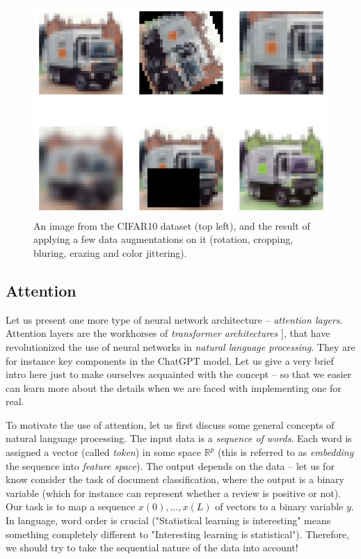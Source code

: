 \documentclass{article}
\newcommand{\R}{\mathbb{R}}
\begin{document}
\begin{figure}
    \centering
    \includegraphics[width=0.65\linewidth]{graphics/augmentation.png}
    \caption{An image from the CIFAR10 dataset (top left), and the result of applying a few data augmentations on it (rotation, cropping, bluring, erazing and color jittering).}
    \label{fig:augment}
\end{figure}

\subsection{Attention}
Let us present one more type of neural network architecture -- \emph{attention layers}. Attention layers are the workhorses of \emph{transformer architectures} \cite{vaswani2017attention}], that have revolutionized the use of neural networks in \emph{natural language processing}. They are for instance key components in the ChatGPT model. Let us give a very brief intro here just to make ourselves acquainted with the concept -- so that we easier can learn more about the details when we are faced with implementing one for real.

To motivate the use of attention, let us first discuss some general concepts of natural language processing. The input data is a \emph{sequence of words}. Each word is assigned a vector (called \emph{token}) in some space $\R^p$ (this is referred to as \emph{embedding} the sequence into \emph{feature space}). The output depends on the data -- let us for know consider the task of document classification, where the output is a binary variable (which for instance can represent whether a review is positive or not). Our task is to map a sequence $x(0), \dots, x(L)$ of vectors to a binary variable $y$. In language, word order is crucial ("Statistical learning is interesting" means something completely different to "Interesting learning is statistical"). Therefore, we should try to take the sequential nature of the data into account!
\end{document}
